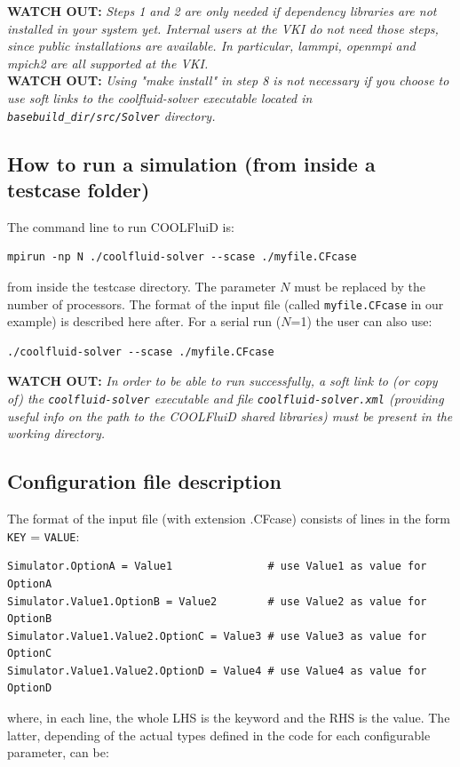 \documentclass[11pt]{article}
\begin{document}
{\bf WATCH OUT:} {\it Steps 1 and 2 are only needed if dependency libraries are not installed in your system yet. Internal users at the VKI do not need those steps, since public installations are available. In particular, lammpi, openmpi and mpich2 are all supported at the VKI.
}  \\

{\bf WATCH OUT:} {\it Using "make install" in step 8 is not necessary if you choose to use soft links to the coolfluid-solver executable located in
  \texttt{basebuild\_dir/src/Solver} directory.  
}

\subsection{How to run a simulation (from inside a testcase folder)}

The command line to run COOLFluiD is: 

\begin{verbatim}
mpirun -np N ./coolfluid-solver --scase ./myfile.CFcase
\end{verbatim}
from inside the testcase directory. The parameter $N$ must be replaced by the number of 
processors. The format of the input file (called {\tt myfile.CFcase} in our example) is described here after.
For a serial run ($N$=1) the user can also use:

\begin{verbatim}
./coolfluid-solver --scase ./myfile.CFcase
\end{verbatim}

{\bf WATCH OUT:} {\it In order to be able to run successfully, a soft link to (or copy of) the {\tt coolfluid-solver} executable and file {\tt coolfluid-solver.xml} (providing useful info on the path to the COOLFluiD shared libraries) must be present in the working directory.}
 
\subsection{Configuration file description}

The format of the input file (with extension .CFcase) consists of lines in the form {\tt KEY} = {\tt VALUE}:
\vspace{-0.2cm}
\begin{verbatim}
Simulator.OptionA = Value1               # use Value1 as value for OptionA
Simulator.Value1.OptionB = Value2        # use Value2 as value for OptionB
Simulator.Value1.Value2.OptionC = Value3 # use Value3 as value for OptionC
Simulator.Value1.Value2.OptionD = Value4 # use Value4 as value for OptionD
\end{verbatim} 
where, in each line, the whole LHS is the keyword and the RHS is the value. The
latter, depending of the actual types defined in the code for each configurable parameter, can be:
\end{document}
